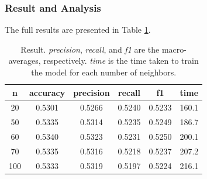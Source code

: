 \documentclass[times, twocolumn]{article}
\begin{document}
\subsubsection{Result and Analysis}
The full results are presented in Table \ref{table:result}.
\begin{table}
    \begin{center}
        \begin{tabular}{|c||c|c|c|c|c|} \hline
            n & accuracy & precision & recall & f1 & time \\ \hline
            20  & 0.5301 & 0.5266 & 0.5240 & 0.5233 & 160.1 \\
            50  & 0.5335 & 0.5314 & 0.5235 & 0.5249 & 186.7 \\
            60  & 0.5340 & 0.5323 & 0.5231 & 0.5250 & 200.1 \\
            70  & 0.5335 & 0.5316 & 0.5218 & 0.5237 & 207.2 \\
            100 & 0.5333 & 0.5319 & 0.5197 & 0.5224 & 216.1 \\
            \hline
        \end{tabular}
        \caption{Result. \textit{precision}, \textit{recall}, and \textit{f1} are the macro-averages, respectively. \textit{time} is the time taken to train the model for each number of neighbors.}
        \label{table:result}
    \end{center}
\end{table}
\end{document}
